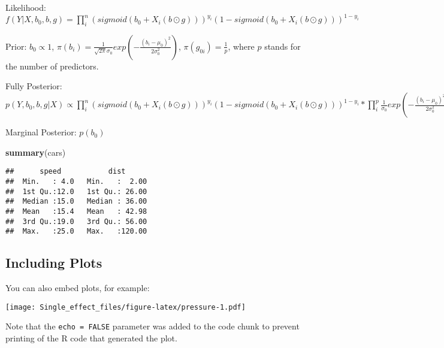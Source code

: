 \documentclass[
]{article}
\newenvironment{Shaded}{\begin{snugshade}}{\end{snugshade}}
\newcommand{\KeywordTok}[1]{\textcolor[rgb]{0.13,0.29,0.53}{\textbf{#1}}}
\newcommand{\NormalTok}[1]{#1}
\begin{document}
Likelihood:
\(f(Y|X,b_0, b, g) = \prod_i^n (sigmoid(b_0 + X_i(b \odot g)))^{y_i}(1 - sigmoid(b_0 + X_i(b \odot g)))^{1 - y_i}\)

Prior: \(b_0 \varpropto 1\),
\(\pi(b_i) = \frac{1}{\sqrt{2\pi}\sigma_0}exp(-\frac{(b_i - \mu_0)^2}{2\sigma_0^2})\),
\(\pi(g_{0i}) = \frac{1}{p}\), where \(p\) stands for the number of
predictors.

Fully Posterior:
\(p(Y, b_0, b, g | X) \varpropto \prod_i^n (sigmoid(b_0 + X_i(b \odot g)))^{y_i}(1 - sigmoid(b_0 + X_i(b \odot g)))^{1 - y_i} * \prod_i^p \frac{1}{\sigma_0}exp(-\frac{(b_i - \mu_0)^2}{2\sigma_0^2})\)

Marginal Posterior: \(p(b_0)\)

\begin{Shaded}
\begin{Highlighting}[]
\KeywordTok{summary}\NormalTok{(cars)}
\end{Highlighting}
\end{Shaded}

\begin{verbatim}
##      speed           dist       
##  Min.   : 4.0   Min.   :  2.00  
##  1st Qu.:12.0   1st Qu.: 26.00  
##  Median :15.0   Median : 36.00  
##  Mean   :15.4   Mean   : 42.98  
##  3rd Qu.:19.0   3rd Qu.: 56.00  
##  Max.   :25.0   Max.   :120.00
\end{verbatim}

\hypertarget{including-plots}{%
\subsection{Including Plots}\label{including-plots}}

You can also embed plots, for example:

\texttt{[image: Single\_effect\_files/figure-latex/pressure-1.pdf]}

Note that the \texttt{echo\ =\ FALSE} parameter was added to the code
chunk to prevent printing of the R code that generated the plot.
\end{document}
